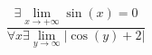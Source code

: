 \documentclass{article}
\begin{document}
$$\frac{\exists \lim_{x \to +\infty}\sin(x )= 0} {\forall x \exists \lim_{y \to \infty }\left |\cos(y )+2\right |}$$
\end{document}
